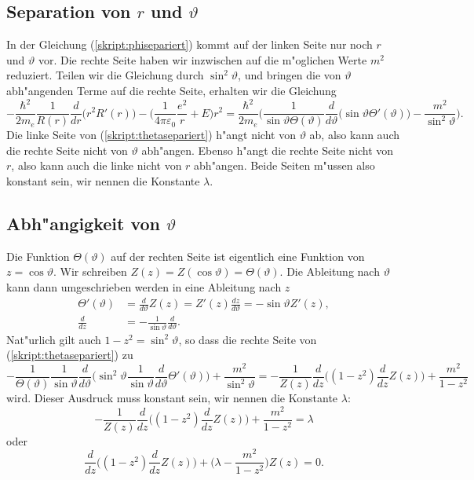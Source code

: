 \subsection{Separation von $r$ und $\vartheta$}
In der Gleichung (\ref{skript:phisepariert}) kommt auf der linken Seite nur
noch $r$ und $\vartheta$ vor.  Die rechte Seite haben wir inzwischen auf
die m"oglichen Werte $m^2$ reduziert. Teilen wir die Gleichung durch
$\sin^2\vartheta$, und bringen die von $\vartheta$ abh"angenden Terme
auf die rechte Seite, erhalten wir die Gleichung
\begin{equation}
-\frac{\hbar^2}{2m_e}
\frac{1}{R(r)}\frac{d}{dr}\bigl(r^2R'(r)\bigr)
-\biggl(\frac{1}{4\pi\varepsilon_0}\frac{e^2}{r}
+
E
\biggr)r^2
=
\frac{\hbar^2}{2m_e}
\biggl(
\frac1{\sin\vartheta\Theta(\vartheta) }
\frac{d}{d\vartheta}\bigl(\sin\vartheta \Theta'(\vartheta)\bigr)
-
\frac{m^2}{\sin^2\vartheta}
\biggr).
\label{skript:thetasepariert}
\end{equation}
Die linke Seite von (\ref{skript:thetasepariert}) h"angt nicht von $\vartheta$
ab, also kann auch die rechte Seite nicht von $\vartheta$ abh"angen.
Ebenso h"angt die rechte Seite nicht von $r$, also kann auch die linke
nicht von $r$ abh"angen. Beide Seiten m"ussen also konstant sein,
wir nennen die Konstante $\lambda$.

\subsection{Abh"angigkeit von $\vartheta$}
Die Funktion $\Theta(\vartheta)$ auf der rechten Seite ist eigentlich
eine Funktion von $z=\cos\vartheta$. Wir schreiben
$Z(z)=Z(\cos\vartheta)=\Theta(\vartheta)$. Die Ableitung nach $\vartheta$
kann dann umgeschrieben werden in eine Ableitung nach $z$
\begin{align*}
\Theta'(\vartheta)&=
\frac{d}{d\vartheta}Z(z)=Z'(z)\frac{dz}{d\vartheta}=-\sin\vartheta Z'(z),
\\
\frac{d}{dz}
&=
-\frac1{\sin\vartheta}\frac{d}{d\vartheta}.
\end{align*}
Nat"urlich gilt auch $1-z^2=\sin^2\vartheta$, so dass die rechte Seite
von (\ref{skript:thetasepariert}) zu
\begin{equation}
-
\frac1{\Theta(\vartheta)}
\frac1{\sin\vartheta}
\frac{d}{d\vartheta}\biggl(
\sin^2\vartheta \frac1{\sin\vartheta}\frac{d}{d\vartheta}\Theta'(\vartheta)
\biggr)
+
\frac{m^2}{\sin^2\vartheta}
=
-\frac1{Z(z)}\frac{d}{dz}\biggl(
(1-z^2)\frac{d}{dz}Z(z)
\biggr)
+
\frac{m^2}{1-z^2}
\end{equation}
wird. Dieser Ausdruck muss konstant sein, wir nennen die Konstante 
$\lambda$:
\begin{equation}
-\frac1{Z(z)}\frac{d}{dz}\biggl(
(1-z^2)\frac{d}{dz}Z(z)
\biggr)
+
\frac{m^2}{1-z^2}
=\lambda
\end{equation}
oder
\begin{equation}
\frac{d}{dz}\biggl(
(1-z^2)\frac{d}{dz}Z(z)
\biggr)
+\biggl(\lambda
-
\frac{m^2}{1-z^2}
\biggr)Z(z)
=0.
\label{skript:legendregleichung}
\end{equation}

